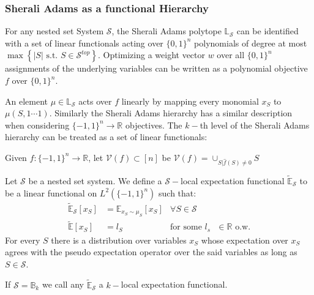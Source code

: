 
\subsubsection{Sherali Adams as a functional Hierarchy}

For any nested set System $\mathcal{S}$, the Sherali Adams polytope $\mathbb{L}_{\mathcal{S}}$ can be identified with a set of linear functionals acting over $\{0,1\}^n$ polynomials of degree at most $\max\left\{ |S| \text{ s.t. } S \in \mathcal{S}^{top}\right\}$. Optimizing a weight vector $w$ over all $\{0, 1\}^n$ assignments of the underlying variables can be written as a polynomial objective $f$ over $\{0,1\}^n$. 

An element $\mu \in \mathbb{L}_{\mathcal{S}}$ acts over $f$ linearly by mapping every monomial $x_S$ to $\mu(S, 1\cdots1 )$. Similarly the Sherali Adams hierarchy has a similar description when considering $\{-1,1\}^n \rightarrow \mathbb{R}$ objectives. The $k-$th level of the Sherali Adams hierarchy can be treated as a set of linear functionals:

\begin{definition}
Given $f:\{-1,1\}^n\rightarrow \mathbb{R}$, let $\mathcal{V}(f) \subset [n]$ be $\mathcal{V}(f) = \cup_{S | \hat{f}(S) \neq 0} S $
\end{definition}

\begin{definition} Let $\mathcal{S}$ be a nested set system. We define a $\mathcal{S}-$local expectation functional $\tilde{\mathbb{E}}_\mathcal{S}$ to be a linear functional on $L^2(\{-1,1\}^n)$ such that:
\begin{align*}
\tilde{\mathbb{E}}_\mathcal{S}[x_S] &= \mathbb{E}_{x_S \sim \mu_S  } [x_S] & \forall S \in \mathcal{S} \\
\tilde{\mathbb{E}}[x_S] 
&= l_S &\text{for some $l_s$ } \in \mathbb{R} \text{ o.w.}
\end{align*}
For every $S$ there is a distribution over variables $x_S$ whose expectation over $x_S$ agrees with the pseudo expectation operator over the said variables as long as $S \in \mathcal{S}$.
\end{definition}


\begin{definition} If $\mathcal{S} =\mathbb{B}_k$ we call any $\tilde{\mathbb{E}}_\mathcal{S}$ a $k-$local expectation functional.
\end{definition}


